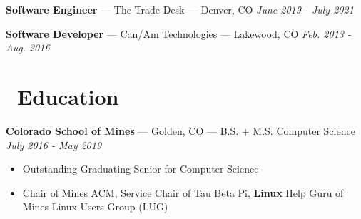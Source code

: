 \documentclass[10pt,letterpaper]{article}
\begin{document}
\vspace{3pt}
{\fontsize{11}{0}
\textbf{Software Engineer} --- The Trade Desk --- Denver, CO}
\hfill \textit{June 2019 - July 2021}




\vspace{3pt}
{\fontsize{11}{0}
\textbf{Software Developer} --- Can/Am Technologies --- Lakewood, CO}
\hfill \textit{Feb. 2013 - Aug. 2016}


\section*{\faBook\ Education}
{\fontsize{11}{0}
\textbf{Colorado School of Mines} --- Golden, CO --- B.S. + M.S. Computer Science}
\hfill \textit{July 2016 - May 2019}
\begin{itemize}
    \item Outstanding Graduating Senior for Computer Science
    \item Chair of Mines ACM, Service Chair of Tau Beta Pi, \textbf{Linux} Help
        Guru of Mines Linux Users Group (LUG)
\end{itemize}
\end{document}
